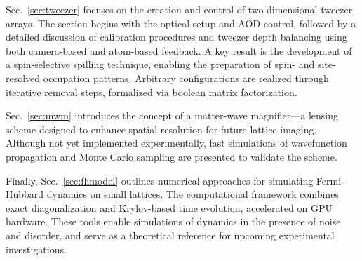 Sec.~\ref{sec:tweezer} focuses on the creation and control of two-dimensional tweezer arrays. The section begins with the optical setup and AOD control, followed by a detailed discussion of calibration procedures and tweezer depth balancing using both camera-based and atom-based feedback. A key result is the development of a spin-selective spilling technique, enabling the preparation of spin- and site-resolved occupation patterns. Arbitrary configurations are realized through iterative removal steps, formalized via boolean matrix factorization.

Sec.~\ref{sec:mwm} introduces the concept of a matter-wave magnifier—a lensing scheme designed to enhance spatial resolution for future lattice imaging. Although not yet implemented experimentally, fast simulations of wavefunction propagation and Monte Carlo sampling are presented to validate the scheme.

Finally, Sec.~\ref{sec:fhmodel} outlines numerical approaches for simulating Fermi-Hubbard dynamics on small lattices. The computational framework combines exact diagonalization and Krylov-based time evolution, accelerated on GPU hardware. These tools enable simulations of dynamics in the presence of noise and disorder, and serve as a theoretical reference for upcoming experimental investigations.



